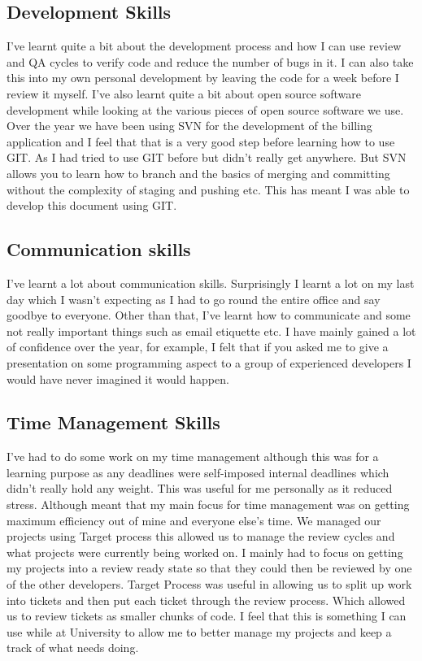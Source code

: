 {	\subsection{Development Skills}{
		I've learnt quite a bit about the development process and how I can use review and QA cycles to verify code and reduce the number of bugs in it. I can also take this into my own personal development by leaving the code for a week before I review it myself. I've also learnt quite a bit about open source software development while looking at the various pieces of open source software we use. Over the year we have been using SVN for the development of the billing application and I feel that that is a very good step before learning how to use GIT. As I had tried to use GIT before but didn't really get anywhere. But SVN allows you to learn how to branch and the basics of merging and committing without the complexity of staging and pushing etc. This has meant I was able to develop this document using GIT.
	}
	\subsection{Communication skills}{I've learnt a lot about communication skills. Surprisingly I learnt a lot on my last day which I wasn't expecting as I had to go round the entire office and say goodbye to everyone. Other than that, I've learnt how to communicate and some not really important things such as email etiquette etc. I have mainly gained a lot of confidence over the year, for example, I felt that if you asked me to give a presentation on some programming aspect to a group of experienced developers I would have never imagined it would happen.}
	\subsection{Time Management Skills}{I've had to do some work on my time management although this was for a learning purpose as any deadlines were self-imposed internal deadlines which didn't really hold any weight. This was useful for me personally as it reduced stress. Although meant that my main focus for time management was on getting maximum efficiency out of mine and everyone else's time. We managed our projects using Target process\cite{targetProcess2017} this allowed us to manage the review cycles and what projects were currently being worked on. I mainly had to focus on getting my projects into a review ready state so that they could then be reviewed by one of the other developers. Target Process\cite{targetProcess2017} was useful in allowing us to split up work into tickets and then put each ticket through the review process. Which allowed us to review tickets as smaller chunks of code. I feel that this is something I can use while at University to allow me to better manage my projects and keep a track of what needs doing.
}}
